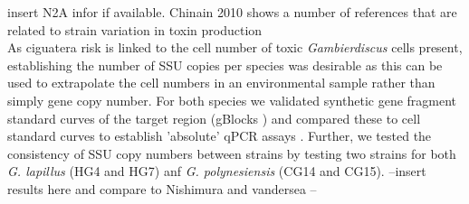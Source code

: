 \documentclass[12pt]{article}
\begin{document}
insert N2A infor if available. Chinain 2010 shows a number of references that are related to strain variation in toxin production\\

As ciguatera risk is linked to the cell number of toxic \emph{Gambierdiscus} cells present, establishing the number of SSU copies per species was desirable as this can be used to extrapolate the cell numbers in an environmental sample rather than simply gene copy number. For both species we validated synthetic gene fragment standard curves of the target region (gBlocks \textsuperscript{\textregistered}) and compared these to cell standard curves to establish 'absolute' qPCR assays \cite{nishimura2016quantitative,hariganeya2013quantitative}. Further, we tested the consistency of SSU copy numbers between strains by testing two strains for both \emph{G. lapillus} (HG4 and HG7) anf \emph{G. polynesiensis} (CG14 and CG15).
--insert results here and compare to Nishimura and vandersea --%
\end{document}
